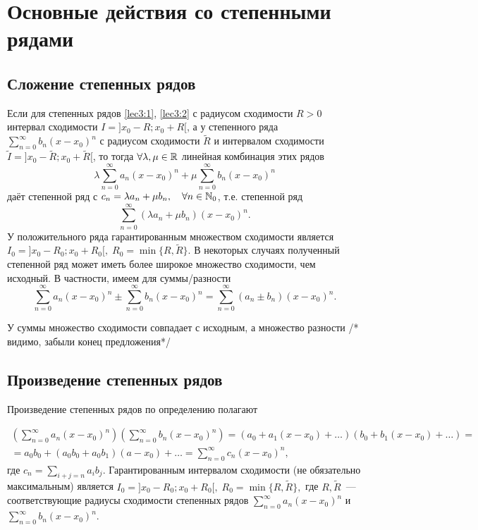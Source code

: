 \documentclass[../../main.tex]{subfiles}
\begin{document}
    \section{Основные действия со степенными рядами}
    \subsection{Сложение степенных рядов}
    
    Если для степенных рядов \eqref{lec3:1}, \eqref{lec3:2}  с радиусом 
    сходимости $R > 0$ интервал сходимости $I = ]x_0-R; x_0 + R[$, а у 
    степенного ряда $\sum\limits_{n = 0}^{\infty} b_n(x-x_0)^n$ с радиусом 
    сходимости $\widetilde R$ и интервалом сходимости $\widetilde I = 
    ]x_0-\widetilde R; x_0 + \widetilde R[$, то тогда $\forall \lambda, \mu \in 
    \mathbb{R}$ линейная комбинация этих рядов
    \[\lambda \sum\limits_{n = 0}^{\infty}a_n(x-x_0)^n + \mu 
    \sum\limits_{n = 0}^{\infty} b_n(x-x_0)^n \]
    даёт степенной ряд с $c_n = \lambda a_n + \mu b_n, \quad \forall n \in 
    \mathbb{N}_0$, т.е. степенной ряд
    \[ \sum\limits_{n = 0}^{\infty}(\lambda a_n + \mu b_n)(x-x_0)^n. \]
    У положительного ряда гарантированным множеством сходимости является 
    $I_0 = ]x_0-R_0; x_0 + R_0[, \; R_0 = \min \{R, \widetilde R\}$. В 
    некоторых случаях полученный степенной ряд может иметь более широкое 
    множество сходимости, чем исходный. В частности, имеем для суммы/разности
    \[ \sum\limits_{n = 0}^{\infty}a_n(x-x_0)^n \pm 
    \sum\limits_{n = 0}^{\infty}b_n(x-x_0)^n = 
    \sum\limits_{n = 0}^{\infty}(a_n \pm b_n) (x-x_0)^n.  \]

    У суммы множество сходимости совпадает с исходным, а множество разности 
    /* видимо, забыли конец предложения*/
    
    \subsection{Произведение степенных рядов}
    Произведение степенных рядов по определению полагают

    \begin{multline*}
        \left( \sum\limits_{n = 0}^{\infty}a_n(x-x_0)^n \right)
        \left( \sum\limits_{n = 0}^{\infty}b_n(x-x_0)^n \right) = 
        (a_0 + a_1(x - x_0) + \ldots)(b_0 + b_1(x - x_0) + \ldots) =
        \\ = a_0b_0 + (a_0b_0 + a_0b_1)(a - x_0) + \ldots = 
        \sum\limits_{n = 0}^{\infty}c_n(x-x_0)^n, 
    \end{multline*}
    где $c_n = \sum\limits_{i + j = n} a_ib_j$. Гарантированным интервалом 
    сходимости (не обязательно максимальным) является $I_0 = ]x_0-R_0; x_0 + 
    R_0[, \; R_0 = \min \{R, \widetilde R\},$ где $R, \widetilde R$~--- 
    соответствующие радиусы сходимости степенных рядов $\sum\limits_{n = 0}^
    {\infty}a_n(x-x_0)^n$ и $\sum\limits_{n = 0}^{\infty}b_n(x-x_0)^n$.
    
\end{document}
